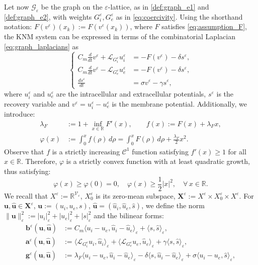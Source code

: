 \documentclass[a4paper,11pt]{article}
\theoremstyle{definition}
\numberwithin{equation}{section}
\newcommand{\e}{\varepsilon}
\newcommand{\V}{\mathcal{V}}
\begin{document}
Let now $\mathcal G_\e$ be the graph on the $\e$-lattice, as in \eqref{def:graph_e1} and \eqref{def:graph_e2}, with weights $G_i^\e,G_e^\e$ as in \eqref{eq:coercivity}. Using the shorthand notation: $F(v^\e)(x_k):=F(v^\e(x_k))$, where $F$ satisfies \eqref{eq:assumption_F}, the KNM system can be expressed in terms of the combinatorial Laplacian \eqref{eq:graph_laplacians} as
\begin{equation}
	\label{eq:system_e}
	\left\{
	\begin{aligned}
		C_m \frac{d}{dt}v^\e 
		+ \mathcal L_{G_i^\e} u_i^{\e}
		&= -F(v^\e) - \delta s^\e, \\%
		C_m \frac{d}{dt}v^\e 
		- \mathcal L_{G_e^\e} u_e^\e
		&= -F(v^\e) - \delta s^\e, \\%
		\frac{d s^\e}{dt} &= \sigma v^\e - \gamma s^\e,
	\end{aligned}
	\right.
\end{equation}
where $u_i^{\e}$ and $u_e^{\e}$ are the intracellular and extracellular potentials, $s^\e$  is the recovery variable and $v^\e =u_i^\e-u_e^\e$ is the membrane potential. Additionally, we introduce:
\begin{align}
	\lambda_F &:= 1+\inf_{x \in \mathbb R}F'(x), \qquad f(x):=F(x)+\lambda_F x, \label{def:lambda}\\
	\varphi(x) &:=\int_0^x f(\rho)\,d\rho =\int_0^x F(\rho)\,d\rho+\frac{\lambda_F}{2}x^2.\label{def:varphi}
\end{align}
Observe that $f$ is a strictly increasing $\mathcal{C}^1$ function satisfying $f'(x)\ge1$ for all $x\in\mathbb R$. Therefore, $\varphi$ is a
strictly convex function with at least quadratic growth, thus satisfying:
\begin{equation}
	\label{eq:phi}
	\varphi(x) \geq \varphi(0)=0, \quad \varphi(x) \geq \dfrac{1}{2}|x|^2, \quad \forall \,x \in \mathbb{R}.
\end{equation}
We recall that  $X^\e := \mathbb{R}^{\V_\e} $, $X_0^\e$ is its zero-mean subspace, $ \mathbf{X}^\e:=X^\e \times X^{\e}_0 \times X^\e.$ For $\mathbf{u},\widehat{\mathbf{u}}\in \mathbf{X}^\e$, $\mathbf u:=(u_{i},u_{e},s)$, $\widehat{\mathbf u}=(\widehat u_i,\widehat u_e,\widehat s)$, we define the norm $\|\mathbf{u} \|_\e^2  := |u_i|_\e^2 + |u_{e}|_\e^2 + |s|_\e^2$ and the bilinear forms:
\begin{align*}
	\mathbf{b}^\e(\mathbf u,\widehat{\mathbf u}) 
	&:= C_m\langle u_i-u_e, \widehat{u}_i - \widehat{u}_e \rangle_\e 
	+ \langle s,\widehat s\rangle_\e,  \\%
	\mathbf{a}^\e(\mathbf u,\widehat{\mathbf u}) 
	&:=   \langle \mathcal L_{G_i^\e} u_i, \widehat{u}_i \rangle_\e 
	+ \langle \mathcal L_{G_e^\e} u_e, \widehat{u}_e \rangle_\e 
	+\gamma\langle s,\widehat s\rangle_\e, \\%
	\mathbf{g}^\e(\mathbf u, \widehat{\mathbf u}) 
	&:= \lambda_F \langle u_i-u_e, \widehat u_i - \widehat u_e \rangle_\e 
	- \delta \langle s, \widehat u_i - \widehat u_e \rangle_\e 
	+ \sigma \langle u_i-u_e, \widehat s \rangle_\e,
\end{align*}
\end{document}
